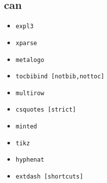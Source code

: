 \subsection{can}
\begin{itemize}
  \item \texttt{expl3}
  \item \texttt{xparse}
  \item \texttt{metalogo}
  \item \texttt{tocbibind [notbib,nottoc]}
  \item \texttt{multirow}
  \item \texttt{csquotes [strict]}
  \item \texttt{minted}
  \item \texttt{tikz}
  \item \texttt{hyphenat}
  \item \texttt{extdash [shortcuts]}
\end{itemize}
